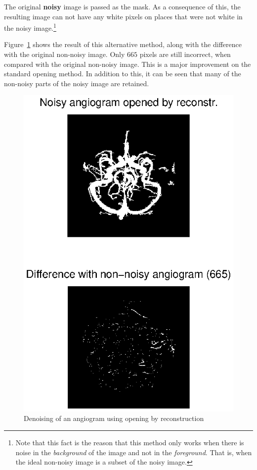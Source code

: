 The original \textbf{noisy} image is passed as the mask.
As a consequence of this, the resulting image can not have any white pixels on places that were not white in the noisy image.\footnote{Note that this fact is the reason that this method only works when there is noise in the \emph{background} of the image and not in the \emph{foreground}. That is, when the ideal non-noisy image is a subset of the noisy image.}

Figure~\ref{fig:angio_open_recon} shows the result of this alternative method, along with the difference with the original non-noisy image.
Only \(665\) pixels are still incorrect, when compared with the original non-noisy image.
This is a major improvement on the standard opening method.
In addition to this, it can be seen that many of the non-noisy parts of the noisy image are retained.

\begin{figure}[htb]
 \centering
 \includegraphics[width=\linewidth]{angio_open_recon.eps}
 \caption{Denoising of an angiogram using opening by reconstruction}
 \label{fig:angio_open_recon}
\end{figure}
\clearpage